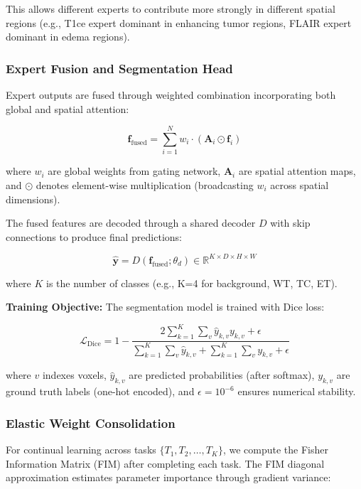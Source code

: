 \documentclass[conference]{IEEEtran}
\begin{document}
This allows different experts to contribute more strongly in different spatial regions (e.g., T1ce expert dominant in enhancing tumor regions, FLAIR expert dominant in edema regions).

\subsubsection{Expert Fusion and Segmentation Head}

Expert outputs are fused through weighted combination incorporating both global and spatial attention:

\begin{equation}
\mathbf{f}_{\text{fused}} = \sum_{i=1}^{N} w_i \cdot (\mathbf{A}_i \odot \mathbf{f}_i)
\end{equation}

where $w_i$ are global weights from gating network, $\mathbf{A}_i$ are spatial attention maps, and $\odot$ denotes element-wise multiplication (broadcasting $w_i$ across spatial dimensions).

The fused features are decoded through a shared decoder $D$ with skip connections to produce final predictions:

\begin{equation}
\hat{\mathbf{y}} = D(\mathbf{f}_{\text{fused}}; \theta_d) \in \mathbb{R}^{K \times D \times H \times W}
\end{equation}

where $K$ is the number of classes (e.g., K=4 for background, WT, TC, ET).

\textbf{Training Objective:} The segmentation model is trained with Dice loss:

\begin{equation}
\mathcal{L}_{\text{Dice}} = 1 - \frac{2\sum_{k=1}^{K}\sum_{v} \hat{y}_{k,v} y_{k,v} + \epsilon}{\sum_{k=1}^{K}\sum_{v} \hat{y}_{k,v} + \sum_{k=1}^{K}\sum_{v} y_{k,v} + \epsilon}
\end{equation}

where $v$ indexes voxels, $\hat{y}_{k,v}$ are predicted probabilities (after softmax), $y_{k,v}$ are ground truth labels (one-hot encoded), and $\epsilon=10^{-6}$ ensures numerical stability.

\subsubsection{Elastic Weight Consolidation}

For continual learning across tasks $\{T_1, T_2, \ldots, T_K\}$, we compute the Fisher Information Matrix (FIM) after completing each task. The FIM diagonal approximation estimates parameter importance through gradient variance:
\end{document}
